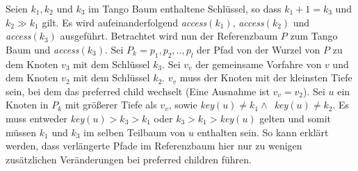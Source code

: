 \documentclass[a4paper,12pt]{article}
\begin{document}
Seien $k_1, k_2$ und $k_3$ im Tango Baum enthaltene Schlüssel, so dass $k_1 + 1 = k_3$ und $k_2 \gg k_1$ gilt. Es wird aufeinanderfolgend \textit{access}$\left(k_1\right)$, \textit{access}$\left(k_2\right)$ und \\ \textit{access}$\left(k_3\right)$ ausgeführt. Betrachtet wird nun der Referenzbaum $P$ zum Tango Baum und \textit{access}$\left(k_3\right)$. Sei $P_k = p_1, p_2,.., p_l$ der Pfad von der Wurzel von $P$ zu dem Knoten $v_3$ mit dem Schlüssel $k_3$. Sei $v_v$ der gemeinsame Vorfahre von $v$ und dem Knoten $v_2$ mit dem Schlüssel $k_2$. $v_v$ muss der Knoten mit der kleinsten Tiefe sein, bei dem das preferred child wechselt (Eine Ausnahme ist $v_v = v_2$). Sei $u$ ein Knoten in $P_k$ mit größerer Tiefe als $v_v$, sowie \mbox{\textit{key}$\left(u\right) \neq k_1 \wedge $ \textit{key}$\left(u \right)\neq k_2 $}. Es muss entweder \textit{key}$\left(u\right) > k_3 > k_1$  oder  $ k_3 > k_1 >$\textit{key}$\left(u\right)$ gelten und somit müssen $k_1$ und $k_3$ im selben Teilbaum von $u$ enthalten sein. So kann erklärt werden, dass verlängerte Pfade im Referenzbaum hier nur zu wenigen zusätzlichen Veränderungen bei preferred children führen. \\  
\end{document}
